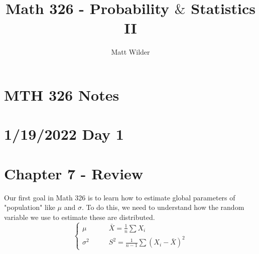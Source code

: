 \documentclass[12pt]{article}
\title{Math 326 - Probability $\&$ Statistics II}
\author{Matt Wilder}
\newcommand{\pars}[1]{\left( {#1} \right) }
\newcommand{\xbar}{\bar{X}}
\renewcommand{\over}[1]{\frac{1}{{#1}}}
\begin{document}
\maketitle

\section*{MTH 326 Notes}
\section*{1/19/2022 Day 1}
\section*{Chapter 7 - Review}
Our first goal in Math 326 is to learn how to estimate global parameters of "population" like $\mu$ and $\sigma$. To do this, we need to understand how the random variable we use to estimate these are distributed.
$$\left\{\begin{aligned}
    \mu & \qquad \bar{X} = \over{n} \sum X_i
    \\
    \sigma^2 & \qquad S^2 = \over{n-1} \sum \pars{X_i - \xbar}^2
    \end{aligned}\right.$$

\end{document}
